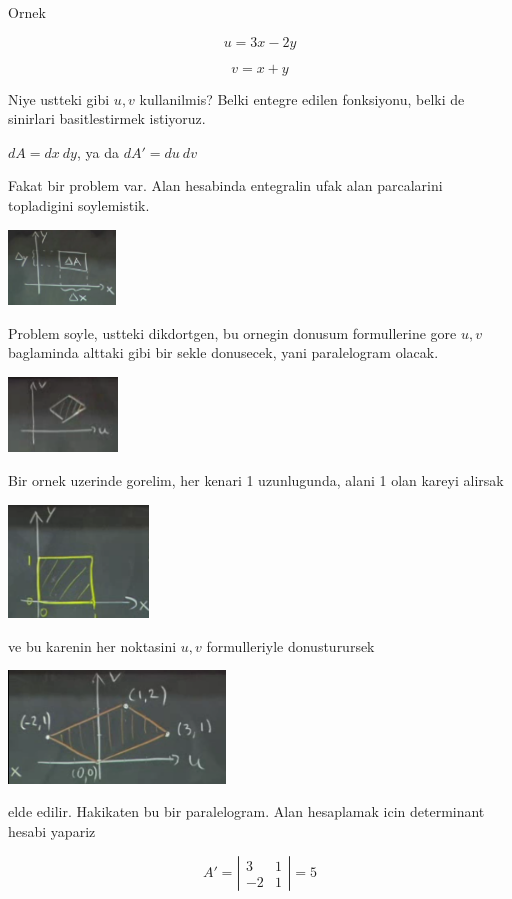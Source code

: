 \documentclass[12pt,fleqn]{article}
\begin{document}
Ornek 

\[ u = 3x - 2y \]

\[ v = x + y \]

Niye ustteki gibi $u,v$ kullanilmis? Belki entegre edilen fonksiyonu, belki
de sinirlari basitlestirmek istiyoruz. 

$dA = dx \ dy$, ya da $dA' = du \ dv$ 

Fakat bir problem var. Alan hesabinda entegralin ufak alan parcalarini
topladigini soylemistik. 

\includegraphics[height=2cm]{18_2.png}

Problem soyle, ustteki dikdortgen, bu ornegin donusum formullerine gore
$u,v$ baglaminda alttaki gibi bir sekle donusecek, yani paralelogram
olacak. 

\includegraphics[height=2cm]{18_3.png}

Bir ornek uzerinde gorelim, her kenari 1 uzunlugunda, alani 1 olan kareyi
alirsak

\includegraphics[height=3cm]{18_4.png}

ve bu karenin her noktasini $u,v$ formulleriyle donusturursek

\includegraphics[height=3cm]{18_5.png}

elde edilir. Hakikaten bu bir paralelogram. Alan hesaplamak icin
determinant hesabi yapariz

\[ A' = 
\left|\begin{array}{rr}
3 & 1 \\
-2 & 1
\end{array}\right| = 5
 \]
\end{document}
